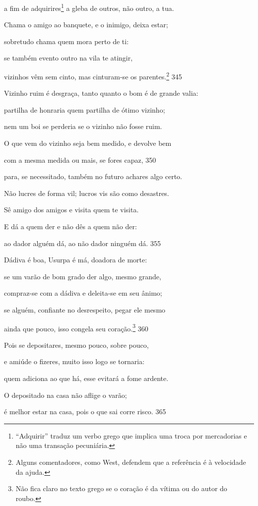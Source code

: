 a fim de adquirires\footnote{``Adquirir'' traduz um verbo grego que implica uma troca por mercadorias e não uma transação pecuniária.} a gleba de outros, não outro, a tua.

Chama o amigo ao banquete, e o inimigo, deixa estar;

sobretudo chama quem mora perto de ti:

se também evento outro na vila te atingir,

vizinhos vêm sem cinto, mas cinturam-se os parentes.\footnote{Alguns comentadores, como West, defendem que a referência é à
velocidade da ajuda.} \num{345}

Vizinho ruim é desgraça, tanto quanto o bom é de grande \qb{}valia:

partilha de honraria quem partilha de ótimo vizinho;

nem um boi se perderia se o vizinho não fosse ruim.

O que vem do vizinho seja bem medido, e devolve bem

com a mesma medida ou mais, se fores capaz, \num{350}

para, se necessitado, também no futuro achares algo certo.

Não lucres de forma vil; lucros vis são como desastres.

Sê amigo dos amigos e visita quem te visita.

E dá a quem der e não dês a quem não der:

ao dador alguém dá, ao não dador ninguém dá. \num{355}

Dádiva é boa, Usurpa é má, doadora de morte:

se um varão de bom grado der algo, mesmo grande,

compraz-se com a dádiva e deleita-se em seu ânimo;

se alguém, confiante no desrespeito, pegar ele mesmo

ainda que pouco, isso congela seu coração.\footnote{Não fica claro no texto grego se o coração é da vítima ou do autor do roubo.} \num{360}

Pois se depositares, mesmo pouco, sobre pouco,

e amiúde o fizeres, muito isso logo se tornaria:

quem adiciona ao que há, esse evitará a fome ardente.

O depositado na casa não aflige o varão;

é melhor estar na casa, pois o que sai corre risco. \num{365}

